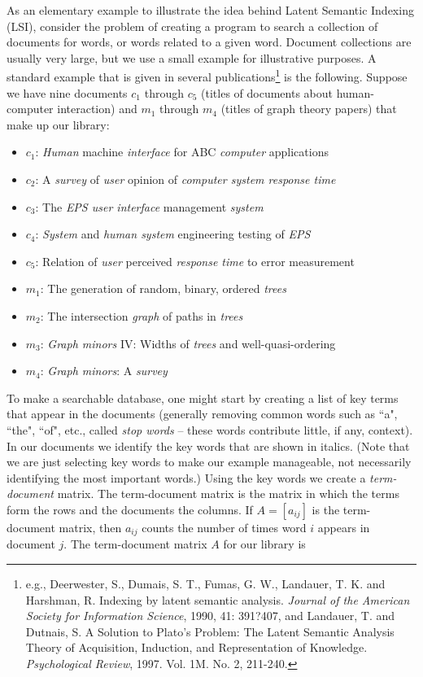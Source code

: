 \ee

    
As an elementary example to illustrate the idea behind Latent Semantic Indexing (LSI), consider the problem of creating a program to search a collection of documents for words, or words related to a given word. Document collections are usually very large, but we use a small example for illustrative purposes. A standard example that is given in several publications\footnote{ e.g., Deerwester, S., Dumais, S. T., Fumas, G. W., Landauer, T. K. and Harshman, R. Indexing by latent semantic analysis. \emph{Journal of the American Society for Information Science}, 1990, 41: 391?407, and Landauer, T. and  Dutnais, S. A Solution to Plato's Problem: The Latent Semantic Analysis Theory of Acquisition, Induction, and Representation of Knowledge. \emph{Psychological Review}, 1997. Vol. 1M. No. 2, 211-240.} is the following. Suppose we have nine documents $c_1$ through $c_5$ (titles of documents about human-computer interaction) and $m_1$ through $m_4$ (titles of graph theory papers) that make up our library: 
\begin{itemize}
\setlength{\itemsep}{0pt}%
\item $c_1$: \emph{Human} machine \emph{interface} for ABC \emph{computer} applications
\item $c_2$: A \emph{survey} of \emph{user} opinion of \emph{computer system response time}
\item $c_3$: The \emph{EPS user interface} management \emph{system}
\item $c_4$: \emph{System} and \emph{human system} engineering testing of \emph{EPS}
\item $c_5$: Relation of \emph{user} perceived \emph{response time} to error measurement
\item $m_1$: The generation of random, binary, ordered \emph{trees}
\item $m_2$: The intersection \emph{graph} of paths in \emph{trees}
\item $m_3$: \emph{Graph minors} IV: Widths of \emph{trees} and well-quasi-ordering
\item $m_4$: \emph{Graph minors}: A \emph{survey}
\end{itemize}
To make a searchable database, one might start by creating a list of key terms that appear in the documents (generally removing common words such as ``a", ``the", ``of", etc., called \emph{stop words} -- these words contribute little, if any, context). In our documents we identify the key words that are shown in italics. (Note that we are just selecting key words to make our example manageable, not necessarily identifying the most important words.) Using the key words we create a \emph{term-document} matrix. The term-document matrix is the matrix in which the terms form the rows and the documents the columns. If $A = [a_{ij}]$ is the term-document matrix, then $a_{ij}$ counts the number of times word $i$ appears in document $j$. The term-document matrix $A$ for our library is  
